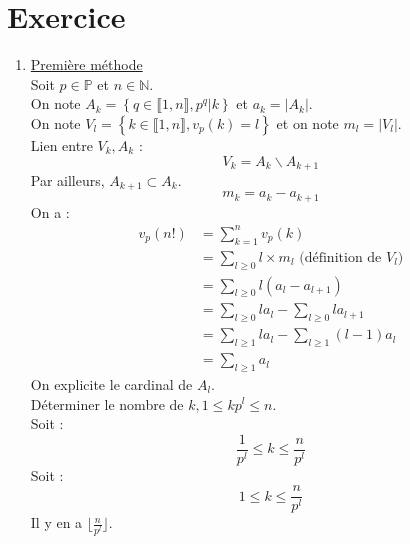 \documentclass{report}
\begin{document}
\section{Exercice}
\begin{enumerate}
    \item \underline{Première méthode} \\
    Soit $p \in \mathbb{P}$ et $n \in \mathbb{N}$. \\
    On note $A_k = \left\{ q \in \llbracket 1, n \rrbracket, p^q | k \right\}$ et $a_k = |A_k|$. \\
    On note $V_l = \left\{ k \in \llbracket 1, n \rrbracket, v_p(k) = l \right\}$ et on note $m_l = |V_l|$. \\
    Lien entre $V_k, A_k$ : \\
    $$V_k = A_k \backslash A_{k+1}$$
    Par ailleurs, $A_{k+1} \subset A_k$. 
    $$m_k = a_k - a_{k+1}$$
    On a : 
    \begin{align*}
        v_p(n!) &= \sum_{k=1}^{n} v_p(k) \\
        &= \sum_{l \geq 0} l \times m_l \text{ (définition de $V_l$)} \\
        &= \sum_{l \geq 0} l(a_l - a_{l+1}) \\
        &= \sum_{l \geq 0} la_l - \sum_{l \geq 0} la_{l+1} \\
        &= \sum_{l \geq 1} la_l - \sum_{l \geq 1} (l-1)a_l \\
        &= \sum_{l \geq 1} a_l
    \end{align*}
    On explicite le cardinal de $A_l$. \\
    Déterminer le nombre de $k, 1 \leq kp^l \leq n$. \\
    Soit :
    $$\frac{1}{p^l} \leq k \leq \frac{n}{p^l}$$
    Soit : 
    $$1 \leq k \leq \frac{n}{p^l}$$
    Il y en a $\lfloor \frac{n}{p^l} \rfloor$. \\ \\


\end{enumerate}
\end{document}
